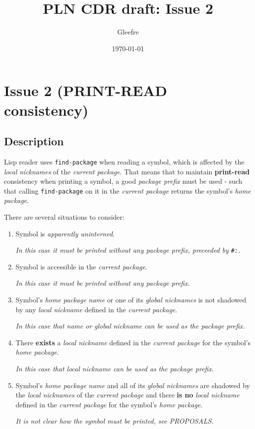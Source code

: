 \documentclass[11pt]{article}
\author{Gleefre}
\date{\today}
\title{PLN CDR draft: Issue 2}
\begin{document}
\maketitle

\section{Issue 2 (PRINT-READ consistency)}
\label{sec:orgb48d8da}
\subsection{Description}
\label{sec:org34b97ef}
Lisp reader uses \texttt{find-package} when reading a symbol, which is affected by the
\emph{local nicknames} of the \emph{current package}. That means that to maintain \textbf{print-read}
consistency when printing a symbol, a good \emph{package prefix} must be used - such that
calling \texttt{find-package} on it in the \emph{current package} returns the symbol's \emph{home
package}.

There are several situations to consider:
\begin{enumerate}
\item Symbol is \emph{apparently uninterned}.

\emph{In this case it must be printed without any package prefix, preceeded by \texttt{\#:}.}

\item Symbol is accessible in the \emph{current package}.

\emph{In this case it must be printed without any package prefix.}

\item Symbol's \emph{home package} \emph{name} or one of its \emph{global nicknames} is not shadowed
by any \emph{local nickname} defined in the \emph{current package}.

\emph{In this case that name or global nickname can be used as the package prefix.}

\item There \textbf{exists} a \emph{local nickname} defined in the \emph{current package} for the
symbol's \emph{home package}.

\emph{In this case that local nickname can be used as the package prefix.}

\item Symbol's \emph{home package} \emph{name} and all of its \emph{global nicknames} are shadowed by
the \emph{local nicknames} of the \emph{current package} and there \textbf{is no} \emph{local nickname}
defined in the \emph{current package} for the symbol's \emph{home package}.

\emph{It is not clear how the symbol must be printed, see PROPOSALS.}
\end{enumerate}
\end{document}
